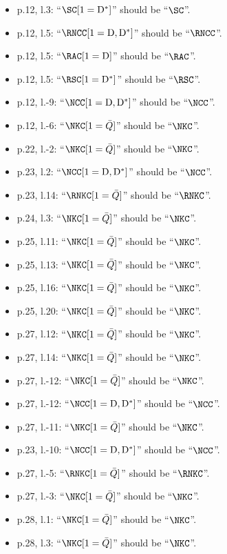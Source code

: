 \documentclass{amsart}
\theoremstyle{definition}
\newcommand{\dual}{^*} %
\newcommand{\dissection}{\mathrm{D}} %
\begin{document}
\begin{enumerate}
\begin{itemize}
    \item p.12, l.3: ``$\SC[1=\dissection\dual]$'' should be ``$\SC$''.
    \item p.12, l.5: ``$\RNCC[1=\dissection,\dissection\dual]$'' should be ``$\RNCC$''.
    \item p.12, l.5: ``$\RAC[1=\dissection]$'' should be ``$\RAC$''.
    \item p.12, l.5: ``$\RSC[1=\dissection\dual]$'' should be ``$\RSC$''.
    \item p.12, l.-9: ``$\NCC[1=\dissection,\dissection\dual]$'' should be ``$\NCC$''.
    \item p.12, l.-6: ``$\NKC[1=\bar Q]$'' should be ``$\NKC$''.
    \item p.22, l.-2: ``$\NKC[1=\bar Q]$'' should be ``$\NKC$''.
    \item p.23, l.2: ``$\NCC[1=\dissection,\dissection\dual]$'' should be ``$\NCC$''.
    \item p.23, l.14: ``$\RNKC[1=\bar Q]$'' should be ``$\RNKC$''.
    \item p.24, l.3: ``$\NKC[1=\bar Q]$'' should be ``$\NKC$''.
    \item p.25, l.11: ``$\NKC[1=\bar Q]$'' should be ``$\NKC$''.
    \item p.25, l.13: ``$\NKC[1=\bar Q]$'' should be ``$\NKC$''.
    \item p.25, l.16: ``$\NKC[1=\bar Q]$'' should be ``$\NKC$''.
    \item p.25, l.20: ``$\NKC[1=\bar Q]$'' should be ``$\NKC$''.
    \item p.27, l.12: ``$\NKC[1=\bar Q]$'' should be ``$\NKC$''.
    \item p.27, l.14: ``$\NKC[1=\bar Q]$'' should be ``$\NKC$''.
    \item p.27, l.-12: ``$\NKC[1=\bar Q]$'' should be ``$\NKC$''.
    \item p.27, l.-12: ``$\NCC[1=\dissection,\dissection\dual]$'' should be ``$\NCC$''.
    \item p.27, l.-11: ``$\NKC[1=\bar Q]$'' should be ``$\NKC$''.
    \item p.23, l.-10: ``$\NCC[1=\dissection,\dissection\dual]$'' should be ``$\NCC$''.    
    \item p.27, l.-5: ``$\RNKC[1=\bar Q]$'' should be ``$\RNKC$''.
    \item p.27, l.-3: ``$\NKC[1=\bar Q]$'' should be ``$\NKC$''.
    \item p.28, l.1: ``$\NKC[1=\bar Q]$'' should be ``$\NKC$''.
    \item p.28, l.3: ``$\NKC[1=\bar Q]$'' should be ``$\NKC$''.

\end{itemize}
\end{enumerate}
\end{document}

